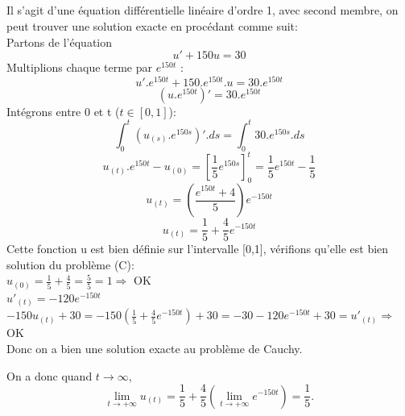 \documentclass[a4paper,12pt,landscape]{article}
\begin{document}
\subsection{}
Il s'agit d'une équation différentielle linéaire d'ordre 1, avec second membre, on peut trouver une solution exacte en procédant comme suit:\\
Partons de l'équation $$u' + 150u = 30$$
Multiplions chaque terme par $e^{150t}$ : $$u'.e^{150t}+150.e^{150t}.u = 30.e^{150t}$$
$$(u.e^{150t})'=30.e^{150t}$$
Intégrons entre 0 et t ($t \in [0,1]$): $$\int_{0}^{t}(u_{(s)}.e^{150s})'.ds = \int_{0}^{t}30.e^{150s}.ds$$
$$u_{(t)}.e^{150t}-u_{(0)} = {\left [ \frac{1}{5}e^{150s} \right ]}_{0}^{t}= \frac{1}{5}e^{150t}-\frac{1}{5}$$
$$u_{(t)} = { \left ( \frac{e^{150t}+4}{5} \right ) }e^{-150t}$$
$$u_{(t)} = \frac{1}{5}+\frac{4}{5}e^{-150t}$$
Cette fonction u est bien définie sur l'intervalle [0,1], vérifions qu'elle est bien solution du problème (C):\\

$u_{(0)}= \frac{1}{5}+\frac{4}{5}=\frac{5}{5}=1 \Rightarrow $ OK\\

$u'_{(t)}= -120e^{-150t}$\\

$-150 u_{(t)} +30 = -150{ \left( \frac{1}{5}+\frac{4}{5}e^{-150t} \right) } +30 = -30 -120e^{-150t} +30 = u'_{(t)} \Rightarrow $OK\\

Donc on a bien une solution exacte au problème de Cauchy.

On a donc quand $t \rightarrow \infty$, 
$$\lim_{t \rightarrow +\infty}u_{(t)}=\frac{1}{5}+\frac{4}{5} { \left( \lim_{t \rightarrow +\infty}e^{-150t} \right ) }= \frac{1}{5}.$$
\end{document}
